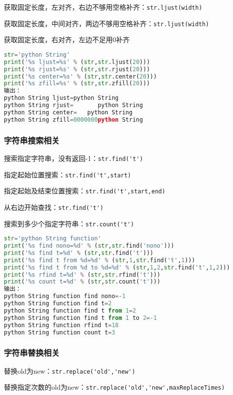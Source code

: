 获取固定长度，左对齐，右边不够用空格补齐：\verb|str.ljust(width)|

获取固定长度，中间对齐，两边不够用空格补齐：\verb|str.ljust(width)|

获取固定长度，右对齐，左边不足用0补齐

\begin{lstlisting}[language=python]
str='python String'
print('%s ljust=%s' % (str,str.ljust(20)))
print('%s rjust=%s' % (str,str.rjust(20)))
print('%s center=%s' % (str,str.center(20)))
print('%s zfill=%s' % (str,str.zfill(20)))
输出：
python String ljust=python String       
python String rjust=       python String
python String center=   python String    
python String zfill=0000000python String

\end{lstlisting}

\subsubsection{字符串搜索相关}
搜索指定字符串，没有返回-1：\verb|str.find('t')|

指定起始位置搜索：\verb|str.find('t',start)|

指定起始及结束位置搜索：\verb|str.find('t',start,end)|

从右边开始查找：\verb|str.find('t')|

搜索到多少个指定字符串：\verb|str.count('t')|

\begin{lstlisting}[language=python]
str='python String function'
print('%s find nono=%d' % (str,str.find('nono')))
print('%s find t=%d' % (str,str.find('t')))
print('%s find t from %d=%d' % (str,1,str.find('t',1)))
print('%s find t from %d to %d=%d' % (str,1,2,str.find('t',1,2)))
print('%s rfind t=%d' % (str,str.rfind('t')))
print('%s count t=%d' % (str,str.count('t')))
输出：
python String function find nono=-1
python String function find t=2
python String function find t from 1=2
python String function find t from 1 to 2=-1
python String function rfind t=18
python String function count t=3
\end{lstlisting}

\subsubsection{字符串替换相关}

替换old为new：\verb|str.replace('old','new')|

替换指定次数的old为new：\verb|str.replace('old','new',maxReplaceTimes)|


